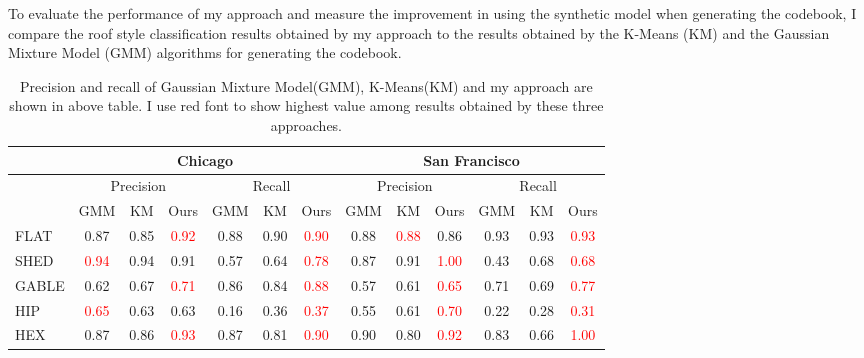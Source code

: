 \documentclass{iitthesis}
\begin{document}
To evaluate the performance of my approach and measure the improvement in using the synthetic model when generating the codebook, I compare the roof style classification results obtained by my approach to the results obtained by the K-Means (KM) and the Gaussian Mixture Model (GMM) algorithms for generating the codebook.

\begin{table}[t]
\caption{Precision and recall of Gaussian Mixture Model(GMM), K-Means(KM) and my approach are shown in above table. I use red font to show highest value among results obtained by these three approaches.}
\centering
\scalebox{0.8}
{
\begin{tabular}{ccccccccccccc}
\hline \hline
&\multicolumn{6}{c}{{Chicago}} & \multicolumn{6}{c}{{San Francisco}}\\ 
\hline

&\multicolumn{3}{c}{{Precision}} & \multicolumn{3}{c}{{Recall}} & \multicolumn{3}{c}{{Precision}} & \multicolumn{3}{c}{{Recall}}\\
\hline

&\multicolumn{1}{c}{GMM} & {KM} & {Ours} & {GMM} & {KM} & {Ours} & {GMM} & {KM} & {Ours} & {GMM} & {KM} & {Ours}\\
\hline

\multicolumn{1}{l}{{FLAT}} & 
\multicolumn{1}{c}{0.87} & 0.85 & \textcolor{red}{0.92} & 
0.88 & 0.90 & \textcolor{red}{0.90} & 
0.88 & \textcolor{red}{0.88} & 0.86 & 
0.93 & 0.93 & \textcolor{red}{0.93}\\


\multicolumn{1}{l}{{SHED}} & 
\multicolumn{1}{c}{\textcolor{red}{0.94}} & 0.94 & 0.91 & 
0.57 & 0.64 & \textcolor{red}{0.78} & 
0.87 & 0.91 & \textcolor{red}{1.00} & 
0.43 & 0.68 & \textcolor{red}{0.68}\\


\multicolumn{1}{l}{{GABLE}} & 
\multicolumn{1}{c}{0.62} & 0.67 & \textcolor{red}{0.71} & 
0.86 & 0.84 & \textcolor{red}{0.88} & 
0.57 & 0.61 & \textcolor{red}{0.65} & 
0.71 & 0.69 & \textcolor{red}{0.77}\\


\multicolumn{1}{l}{{HIP}} & 
\multicolumn{1}{c}{\textcolor{red}{0.65}} & 0.63 & 0.63 & 
0.16 & 0.36 & \textcolor{red}{0.37} & 
0.55 & 0.61 & \textcolor{red}{0.70} & 
0.22 & 0.28 & \textcolor{red}{0.31}\\


\multicolumn{1}{l}{{HEX}} & 
\multicolumn{1}{c}{0.87} & 0.86 & \textcolor{red}{0.93} & 
0.87 & 0.81 & \textcolor{red}{0.90} & 
0.90 & 0.80 & \textcolor{red}{0.92} & 
0.83 & 0.66 & \textcolor{red}{1.00}\\



\end{tabular}}
\end{table}
\end{document}
